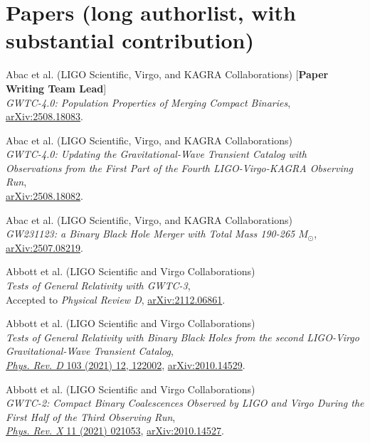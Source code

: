 \section{Papers (long authorlist, with substantial contribution)}
\begin{etaremune}
	\item Abac et al. (LIGO Scientific, Virgo, and KAGRA Collaborations) [\textbf{Paper Writing Team Lead}]\\
	\textit{GWTC-4.0: Population Properties of Merging Compact Binaries},\\
	\href{https://arxiv.org/abs/2508.18083}{arXiv:2508.18083}.
	
	\item Abac et al. (LIGO Scientific, Virgo, and KAGRA Collaborations)\\
	\textit{GWTC-4.0: Updating the Gravitational-Wave Transient Catalog with Observations from the First Part of the Fourth LIGO-Virgo-KAGRA Observing Run},\\
	\href{https://arxiv.org/abs/2508.18082}{arXiv:2508.18082}.
	
	\item Abac et al. (LIGO Scientific, Virgo, and KAGRA Collaborations)\\
	\textit{GW231123: a Binary Black Hole Merger with Total Mass 190-265 $M_\odot$},\\
	\href{https://arxiv.org/abs/2507.08219}{arXiv:2507.08219}.
	
	\item Abbott et al. (LIGO Scientific and Virgo Collaborations)\\
	\textit{Tests of General Relativity with GWTC-3},\\
	Accepted to \textit{Physical Review D}, \href{https://arxiv.org/abs/2112.06861}{arXiv:2112.06861}.
	
	\item Abbott et al. (LIGO Scientific and Virgo Collaborations)\\
	\textit{Tests of General Relativity with Binary Black Holes from the second LIGO-Virgo Gravitational-Wave Transient Catalog},\\
	\href{https://journals.aps.org/prd/abstract/10.1103/PhysRevD.103.122002}{\textit{Phys. Rev. D} 103 (2021) 12, 122002}, \href{https://arxiv.org/abs/2010.14529}{arXiv:2010.14529}.
	
	\item Abbott et al. (LIGO Scientific and Virgo Collaborations)\\
	\textit{GWTC-2: Compact Binary Coalescences Observed by LIGO and Virgo During the First Half of the Third Observing Run},\\
	\href{https://journals.aps.org/prx/abstract/10.1103/PhysRevX.11.021053}{\textit{Phys. Rev. X} 11 (2021) 021053}, \href{https://arxiv.org/abs/2010.14527}{arXiv:2010.14527}.	
	

\end{etaremune}
